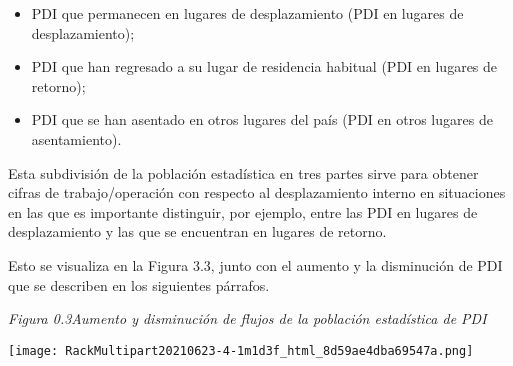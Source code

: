 \documentclass[
]{book}
\providecommand{\tightlist}{%
  \setlength{\itemsep}{0pt}\setlength{\parskip}{0pt}}
\begin{document}
\begin{itemize}
\tightlist
\item
  PDI que permanecen en lugares de desplazamiento (PDI en lugares de desplazamiento);
\item
  PDI que han regresado a su lugar de residencia habitual (PDI en lugares de retorno);
\item
  PDI que se han asentado en otros lugares del país (PDI en otros lugares de asentamiento).
\end{itemize}

Esta subdivisión de la población estadística en tres partes sirve para obtener cifras de trabajo/operación con respecto al desplazamiento interno en situaciones en las que es importante distinguir, por ejemplo, entre las PDI en lugares de desplazamiento y las que se encuentran en lugares de retorno.

Esto se visualiza en la Figura 3.3, junto con el aumento y la disminución de PDI que se describen en los siguientes párrafos.

\emph{Figura 0.3Aumento y disminución de flujos de la población estadística de PDI}

\texttt{[image: RackMultipart20210623-4-1m1d3f\_html\_8d59ae4dba69547a.png]}
\end{document}
